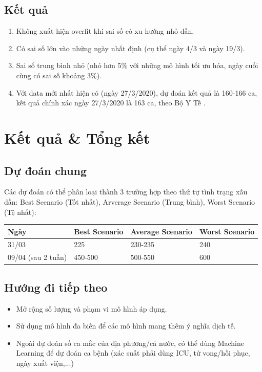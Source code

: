 ﻿\documentclass{article}
\begin{document}
\subsection{Kết quả}

\begin{enumerate}
    \item Không xuất hiện overfit khi sai số có xu hướng nhỏ dần.
    \item Có sai số lớn vào những ngày nhất định (cụ thể ngày 4/3 và ngày 19/3).
    \item Sai số trung bình nhỏ (nhỏ hơn 5\% với những mô hình tối ưu hóa, ngày cuối cùng có sai số khoảng 3\%).  
    \item Với data mới nhất hiện có (ngày 27/3/2020), dự đoán kết quả là 160-166 ca, kết quả chính xác ngày 27/3/2020 là 163 ca, theo Bộ Y Tế \cite{govcov}.
\end{enumerate}

\section{Kết quả \& Tổng kết}

\subsection{Dự đoán chung}

Các dự đoán có thể phân loại thành 3 trường hợp theo thứ tự tình trạng xấu dần: Best Scenario (Tốt nhất), Arverage Scenario (Trung bình), Worst Scenario (Tệ nhất):

\begin{tabular}{llll}
    \textbf{Ngày} & \textbf{Best Scenario} & \textbf{Average Scenario} & \textbf{Worst Scenario} \\
    \hline
    31/03 &  225 & 230-235 & 240 \\
    09/04 (sau 2 tuần) & 450-500 & 500-550 & 600\\
\end{tabular}

\subsection{Hướng đi tiếp theo}

\begin{itemize}
    \item  Mở rộng số lượng và phạm vi mô hình áp dụng.
    \item Sử dụng mô hình đa biến để các mô hình mang thêm ý nghĩa dịch tễ.
    \item Ngoài dự đoán số ca mắc của địa phương/cả nước, có thể dùng Machine Learning để dự đoán ca bệnh (xác suất phải dùng ICU, tử vong/hồi phục, ngày xuất viện,...)
\end{itemize}
\end{document}
